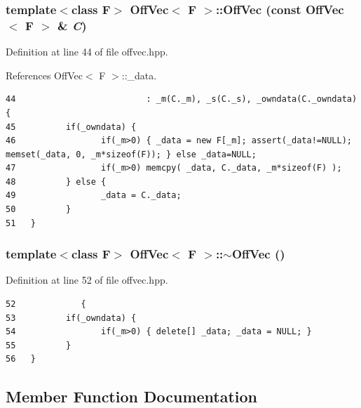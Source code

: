 \subsubsection{\setlength{\rightskip}{0pt plus 5cm}template$<$class F$>$ {\bf Off\-Vec}$<$ F $>$::{\bf Off\-Vec} (const {\bf Off\-Vec}$<$ F $>$ \& {\em C})\hspace{0.3cm}{\tt  [inline]}}\label{classOffVec_495bada658534963c7cd0da174f5fe47_495bada658534963c7cd0da174f5fe47}




Definition at line 44 of file offvec.hpp.

References Off\-Vec$<$ F $>$::\_\-data.

\footnotesize\begin{verbatim}44                          : _m(C._m), _s(C._s), _owndata(C._owndata)  {
45          if(_owndata) {
46                 if(_m>0) { _data = new F[_m]; assert(_data!=NULL); memset(_data, 0, _m*sizeof(F)); } else _data=NULL;
47                 if(_m>0) memcpy( _data, C._data, _m*sizeof(F) );
48          } else {
49                 _data = C._data;
50          }
51   }
\end{verbatim}\normalsize 


\subsubsection{\setlength{\rightskip}{0pt plus 5cm}template$<$class F$>$ {\bf Off\-Vec}$<$ F $>$::$\sim${\bf Off\-Vec} ()\hspace{0.3cm}{\tt  [inline]}}\label{classOffVec_0a72de2c8d3032ef71f1fdf156dc76be_0a72de2c8d3032ef71f1fdf156dc76be}




Definition at line 52 of file offvec.hpp.

\footnotesize\begin{verbatim}52             {
53          if(_owndata) {
54                 if(_m>0) { delete[] _data; _data = NULL; }
55          }
56   }
\end{verbatim}\normalsize 




\subsection{Member Function Documentation}
